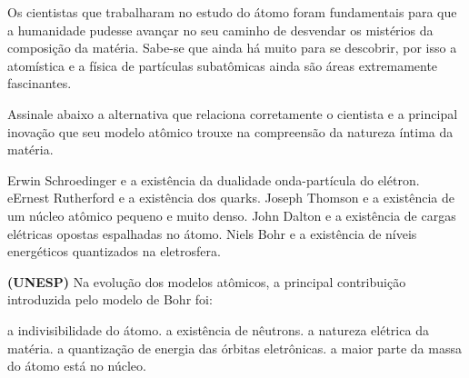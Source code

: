 \documentclass[9 pt]{scrartcl}
\def\PQ{0.84} %
\begin{document}
\begin{exercise}[points=\PQ]
Os cientistas que trabalharam no estudo do átomo foram fundamentais para que a humanidade pudesse avançar no seu caminho de desvendar os mistérios da composição da matéria. Sabe-se que ainda há muito para se descobrir, por isso a atomística e a física de partículas subatômicas ainda são áreas extremamente fascinantes.



Assinale abaixo a alternativa que relaciona corretamente o cientista e a principal inovação que seu modelo atômico trouxe na compreensão da natureza íntima da matéria.

\begin{choice}
\choice Erwin Schroedinger e a existência da dualidade onda-partícula do elétron.
\choice eErnest Rutherford e a existência dos quarks.
\choice Joseph Thomson e a existência de um núcleo atômico pequeno e muito denso.
\choice John Dalton e a existência de cargas elétricas opostas espalhadas no átomo.
\choice  Niels Bohr e a existência de níveis energéticos quantizados na eletrosfera.
\end{choice}
\end{exercise}


\begin{exercise}[points=\PQ]
\textbf{(UNESP)} Na evolução dos modelos atômicos, a principal contribuição introduzida pelo modelo de Bohr foi:

\begin{choice}
\choice a indivisibilidade do átomo.
\choice  a existência de nêutrons.
\choice a natureza elétrica da matéria.
\choice a quantização de energia das órbitas eletrônicas.
\choice a maior parte da massa do átomo está no núcleo.
\end{choice}
\end{exercise}
\end{document}
